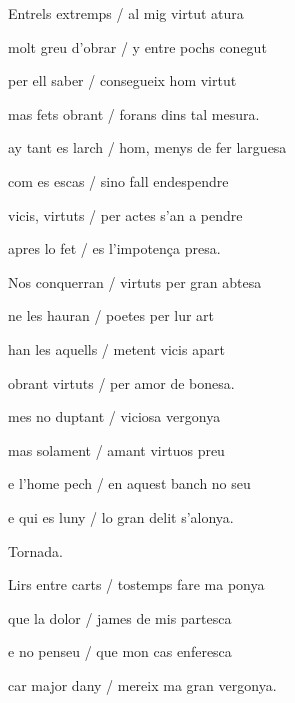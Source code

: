 \documentclass[12pt]{article}
\begin{document}
\begin{estrofa}

 Entrels extremps / al mig virtut atura

 molt greu d'obrar / y entre pochs conegut

 per ell saber / consegueix hom virtut

 mas fets obrant / forans dins tal mesura.

 ay tant es larch / hom, menys de fer larguesa

 com es escas / sino fall endespendre

 vicis, virtuts / per actes s'an a pendre

 apres lo fet / es l'impoten\c{c}a presa.

\end{estrofa}



\begin{estrofa}

 Nos conquerran / virtuts per gran abtesa

 ne les hauran / poetes per lur art

 han les aquells / metent vicis apart

 obrant virtuts / per amor de bonesa.

 mes no duptant / viciosa vergonya

 mas solament / amant virtuos preu

 e l'home pech / en aquest banch no seu

 e qui es luny / lo gran delit s'alonya.

\end{estrofa}


\begin{estrofaExtra}%




\begin{tornada}

Tornada.

\end{tornada}


\end{estrofaExtra}


\begin{estrofa}

 Lirs entre carts / tostemps fare ma ponya

 que la dolor / james de mis partesca

 e no penseu / que mon cas enferesca

 car major dany / mereix ma gran vergonya.

\end{estrofa}
\end{document}

